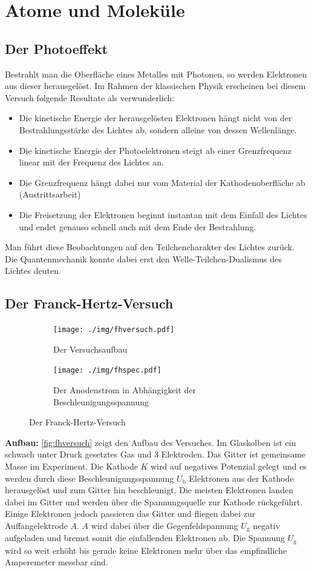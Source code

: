 \chapter{Atome und Moleküle}

\section{Der Photoeffekt}
Bestrahlt man die Oberfläche eines Metalles mit Photonen, so werden Elektronen aus dieser herausgelöst.
Im Rahmen der klassischen Physik erscheinen bei diesem Versuch folgende Resultate als verwunderlich:
\begin{itemize}
	\item Die kinetische Energie der herausgelösten Elektronen hängt nicht von der Bestrahlungsstärke des Lichtes ab, sondern alleine von dessen Wellenlänge.
	\item Die kinetische Energie der Photoelektronen steigt ab einer Grenzfrequenz linear mit der Frequenz des Lichtes an.
	\item Die Grenzfrequenz hängt dabei nur vom Material der Kathodenoberfläche ab (Austrittsarbeit)
	\item Die Freisetzung der Elektronen beginnt instantan mit dem Einfall des Lichtes und endet genauso schnell auch mit dem Ende der Bestrahlung.
\end{itemize}

Man führt diese Beobachtungen auf den Teilchencharakter des Lichtes zurück.
Die Quantenmechanik konnte dabei erst den Welle-Teilchen-Dualismus des Lichtes deuten.

\section{Der Franck-Hertz-Versuch}
\begin{figure}
	\centering
	\begin{subfigure}{0.4\textwidth}
		\centering
		\texttt{[image: ./img/fhversuch.pdf]}
		\caption{Der Versuchsaufbau}
		\label{fig:fhversuch}
	\end{subfigure}
	\begin{subfigure}{0.4\textwidth}
		\centering
		\texttt{[image: ./img/fhspec.pdf]}
		\caption{Der Anodenstrom in Abhängigkeit der Beschleunigungsspannung}
		\label{fig:fhspec}
	\end{subfigure}
	\caption{Der Franck-Hertz-Versuch}
\end{figure}
\textbf{Aufbau:}  \autoref{fig:fhversuch} zeigt den Aufbau des Versuches.
Im Glaskolben ist ein schwach unter Druck gesetztes Gas und 3 Elektroden.
Das Gitter ist gemeinsame Masse im Experiment.
Die Kathode $K$ wird auf negatives Potenzial gelegt und es werden durch diese Beschleunigungsspannung $U_\text{b}$ Elektronen aus der Kathode herausgelöst und zum Gitter hin beschleunigt.
Die meisten Elektronen landen dabei im Gitter und werden über die Spannungsquelle zur Kathode rückgeführt.
Einige Elektronen jedoch passieren das Gitter und fliegen dabei zur Auffangelektrode $A$.
$A$ wird dabei über die Gegenfeldspannung $U_\text{g}$ negativ aufgeladen und bremst somit die einfallenden Elektronen ab.
Die Spannung $U_\text{g}$ wird so weit erhöht bis gerade keine Elektronen mehr über das empfindliche Amperemeter messbar sind.

